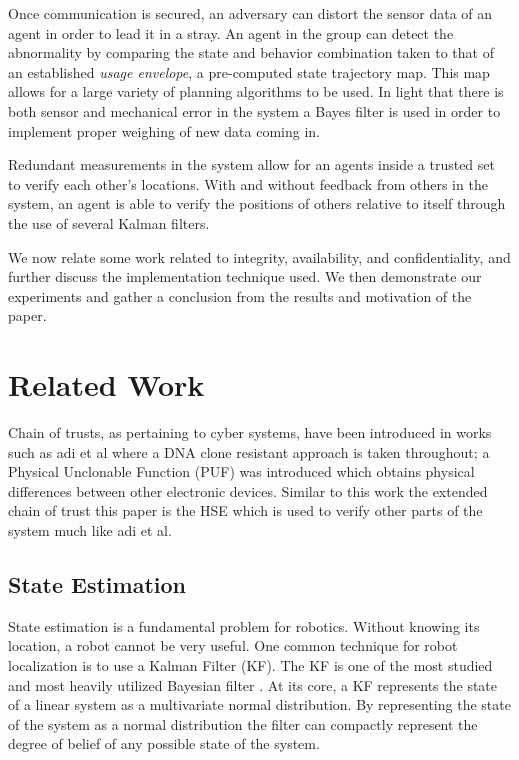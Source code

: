 \documentclass[conference]{IEEEtran}
\begin{document}
Once communication is secured, an adversary can distort the sensor data of an agent in order to lead it in a stray. An agent in the group can detect the abnormality by comparing the state and behavior combination taken to that of an established \textit{usage envelope}, a pre-computed state trajectory map. This map allows for a large variety of planning algorithms to be used. In light that there is both sensor and mechanical error in the system a Bayes filter is used in order to implement proper weighing of new data coming in.

Redundant measurements in the system allow for an agents inside a trusted set to verify each other's locations. With and without feedback from others in the system, an agent is able to verify the positions of others relative to itself through the use of several Kalman filters.

We now relate some work related to integrity, availability, and confidentiality, and further discuss the implementation technique used. We then demonstrate our experiments and gather a conclusion from the results and motivation of the paper.

\section{Related Work}
Chain of trusts, as pertaining to cyber systems, have been introduced in works such as adi et al where a DNA clone resistant approach is taken throughout\cite{adi2009mechatronic}; a Physical Unclonable Function (PUF) was introduced which obtains physical differences between other electronic devices. Similar to this work the extended chain of trust this paper is the HSE which is used to verify other parts of the system much like adi et al\cite{adi2009mechatronic}.

\subsection{State Estimation}
State estimation is a fundamental problem for robotics. Without knowing its location, a robot cannot be very useful. One common technique for robot localization is to use a Kalman Filter (KF). The KF is one of the most studied and most heavily utilized Bayesian filter \cite[39-81]{ProbabilisticRobotics}. At its core, a KF represents the state of a linear system as a multivariate normal distribution. By representing the state of the system as a normal distribution the filter can compactly represent the degree of belief of any possible state of the system.
\end{document}
